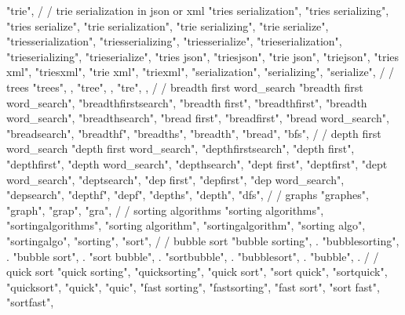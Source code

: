         "trie",  
        /
        / trie serialization in json or xml 
        "tries serialization",  
        "tries serializing",  
        "tries serialize",  
        "trie serialization",  
        "trie serializing",  
        "trie serialize",  
        "triesserialization",  
        "triesserializing",  
        "triesserialize",  
        "trieserialization",  
        "trieserializing",  
        "trieserialize",  
        "tries json",  
        "triesjson",  
        "trie json",  
        "triejson",  
        "tries xml",  
        "triesxml",  
        "trie xml",  
        "triexml",  
        "serialization",  
        "serializing",  
        "serialize",  
        /
        / trees 
        "trees", , 
        "tree", , 
        "tre", , 
        /
        / breadth first word_search 
        "breadth first word_search",  
        "breadthfirstsearch",  
        "breadth first",  
        "breadthfirst",  
        "breadth word_search",  
        "breadthsearch",  
        "bread first",  
        "breadfirst",  
        "bread word_search",  
        "breadsearch",  
        "breadthf",  
        "breadths",  
        "breadth",  
        "bread",  
        "bfs",  
        /
        / depth first word_search 
        "depth first word_search",  
        "depthfirstsearch",  
        "depth first",  
        "depthfirst",  
        "depth word_search",  
        "depthsearch",  
        "dept first",  
        "deptfirst",  
        "dept word_search",  
        "deptsearch",  
        "dep first",  
        "depfirst",  
        "dep word_search",  
        "depsearch",  
        "depthf",  
        "depf",  
        "depths",  
        "depth",  
        "dfs",  
        /
        / graphs 
        "graphes", 
        "graph", 
        "grap", 
        "gra", 
        /
        / sorting algorithms 
        "sorting algorithms",  
        "sortingalgorithms",  
        "sorting algorithm",  
        "sortingalgorithm",  
        "sorting algo",  
        "sortingalgo",  
        "sorting",  
        "sort",  
        /
        / bubble sort 
        "bubble sorting", . 
        "bubblesorting", . 
        "bubble sort", . 
        "sort bubble", . 
        "sortbubble", . 
        "bubblesort", . 
        "bubble", . 
        /
        / quick sort 
        "quick sorting",  
        "quicksorting",  
        "quick sort",  
        "sort quick",  
        "sortquick",  
        "quicksort",  
        "quick",  
        "quic",  
        "fast sorting",  
        "fastsorting",  
        "fast sort",  
        "sort fast",  
        "sortfast",  
